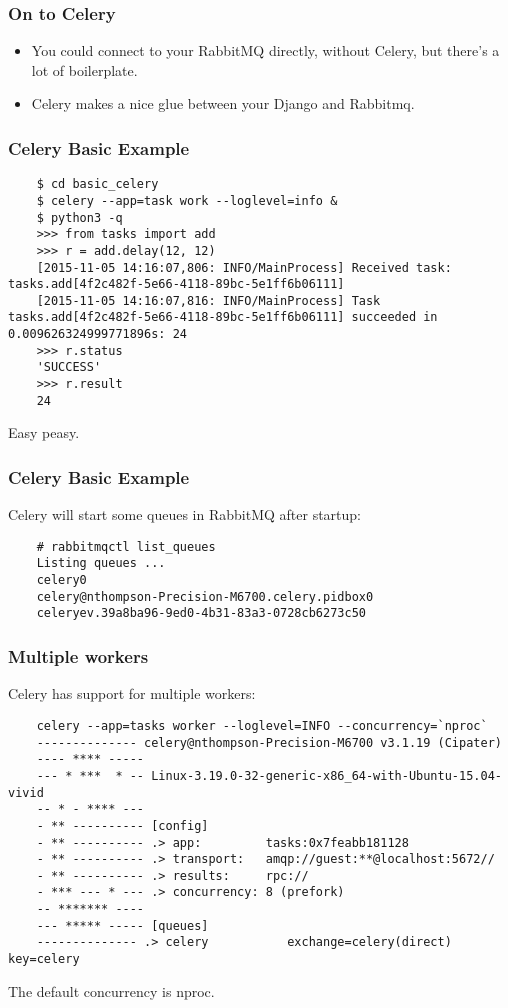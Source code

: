 \documentclass[9pt]{beamer}
\begin{document}
\begin{frame}[fragile]
  \frametitle{On to Celery}
  \begin{itemize}
  \item You could connect to your RabbitMQ directly, without Celery, but there's a lot of boilerplate.
  \item Celery makes a nice glue between your Django and Rabbitmq.
  \end{itemize}
\end{frame}

\begin{frame}[fragile]
  \frametitle{Celery Basic Example}
  \begin{verbatim}
    $ cd basic_celery
    $ celery --app=task work --loglevel=info &
    $ python3 -q
    >>> from tasks import add
    >>> r = add.delay(12, 12)
    [2015-11-05 14:16:07,806: INFO/MainProcess] Received task: tasks.add[4f2c482f-5e66-4118-89bc-5e1ff6b06111]
    [2015-11-05 14:16:07,816: INFO/MainProcess] Task tasks.add[4f2c482f-5e66-4118-89bc-5e1ff6b06111] succeeded in 0.009626324999771896s: 24
    >>> r.status
    'SUCCESS'
    >>> r.result
    24
  \end{verbatim}
  Easy peasy.
\end{frame}

\begin{frame}[fragile]
  \frametitle{Celery Basic Example}
  Celery will start some queues in RabbitMQ after startup:
  \begin{verbatim}
    # rabbitmqctl list_queues
    Listing queues ...
    celery0
    celery@nthompson-Precision-M6700.celery.pidbox0
    celeryev.39a8ba96-9ed0-4b31-83a3-0728cb6273c50
  \end{verbatim}
\end{frame}

\begin{frame}[fragile]
  \frametitle{Multiple workers}
  Celery has support for multiple workers:
  \begin{verbatim}
    celery --app=tasks worker --loglevel=INFO --concurrency=`nproc`
    -------------- celery@nthompson-Precision-M6700 v3.1.19 (Cipater)
    ---- **** -----
    --- * ***  * -- Linux-3.19.0-32-generic-x86_64-with-Ubuntu-15.04-vivid
    -- * - **** ---
    - ** ---------- [config]
    - ** ---------- .> app:         tasks:0x7feabb181128
    - ** ---------- .> transport:   amqp://guest:**@localhost:5672//
    - ** ---------- .> results:     rpc://
    - *** --- * --- .> concurrency: 8 (prefork)
    -- ******* ----
    --- ***** ----- [queues]
    -------------- .> celery           exchange=celery(direct) key=celery
  \end{verbatim}
  The default concurrency is nproc.
\end{frame}
\end{document}
